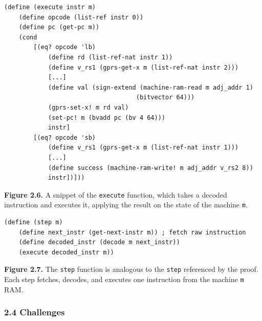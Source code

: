 \documentclass[]{article}
\begin{document}
\begin{verbatim}
(define (execute instr m)
    (define opcode (list-ref instr 0))
    (define pc (get-pc m))
    (cond
        [(eq? opcode 'lb)
            (define rd (list-ref-nat instr 1))
            (define v_rs1 (gprs-get-x m (list-ref-nat instr 2)))
            [...]
            (define val (sign-extend (machine-ram-read m adj_addr 1)
                                    (bitvector 64)))
            (gprs-set-x! m rd val)
            (set-pc! m (bvadd pc (bv 4 64)))
            instr]
        [(eq? opcode 'sb)
            (define v_rs1 (gprs-get-x m (list-ref-nat instr 1)))
            [...]           
            (define success (machine-ram-write! m adj_addr v_rs2 8))
            instr])]))
\end{verbatim}

\textbf{Figure 2.6.} A snippet of the \texttt{execute} function, which
takes a decoded instruction and executes it, applying the result on the
state of the machine \texttt{m}.

\begin{verbatim}
(define (step m)
    (define next_instr (get-next-instr m)) ; fetch raw instruction
    (define decoded_instr (decode m next_instr))
    (execute decoded_instr m))
\end{verbatim}

\textbf{Figure 2.7.} The \texttt{step} function is analogous to the
\texttt{step} referenced by the proof. Each step fetches, decodes, and
executes one instruction from the machine \texttt{m} RAM.

\subsubsection{2.4 Challenges}\label{challenges}
\end{document}
